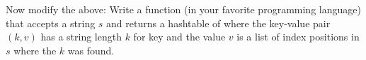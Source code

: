   Now modify the above:
  Write a function (in your favorite programming language)
  that accepts a string $s$ and
  returns a hashtable of where the key-value pair
  $(k, v)$ has a string length $k$ for key
  and the value $v$ is a list of index positions in $s$
  where the $k$ was found.
